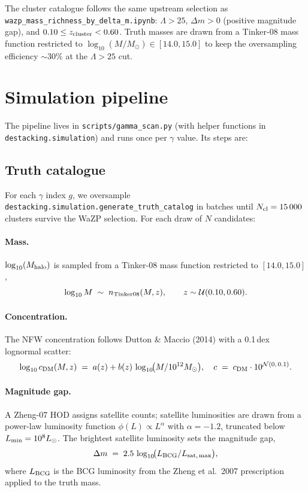 \documentclass[11pt,a4paper]{article}
\newcommand{\Msun}{M_{\odot}}
\newcommand{\Lsun}{L_{\odot}}
\begin{document}
The cluster catalogue follows the same upstream selection as
\verb|wazp_mass_richness_by_delta_m.ipynb|: $\Lambda > 25$, $\Delta m > 0$
(positive magnitude gap), and $0.10 \le z_{\rm cluster} < 0.60$. Truth
masses are drawn from a Tinker-08 mass function restricted to
$\log_{10}(M/\Msun) \in [14.0, 15.0]$ to keep the oversampling
efficiency $\sim$30\% at the $\Lambda > 25$ cut.


\section{Simulation pipeline}
\label{sec:sim}

The pipeline lives in \verb|scripts/gamma_scan.py| (with helper
functions in \verb|destacking.simulation|) and runs once per
$\gamma$ value. Its steps are:

\subsection{Truth catalogue}

For each $\gamma$ index $g$, we oversample
\verb|destacking.simulation.generate_truth_catalog| in batches until
$N_{\rm cl} = 15\,000$ clusters survive the WaZP selection. For each
draw of $N$ candidates:

\paragraph{Mass.}
$\log_{10}(M_{\rm halo})$ is sampled from a Tinker-08
mass function restricted to $[14.0, 15.0]$,
\begin{equation}
\log_{10} M \;\sim\; n_{\rm Tinker08}(M, z),
\qquad z \sim \mathcal{U}(0.10, 0.60).
\end{equation}

\paragraph{Concentration.}
The NFW concentration follows Dutton \& Maccio (2014) with a 0.1\,dex
lognormal scatter:
\begin{equation}
\log_{10} c_{\rm DM}(M, z)
\;=\; a(z) + b(z)\,\log_{10}\!\bigl(M / 10^{12}\Msun\bigr),
\quad
c \;=\; c_{\rm DM} \cdot 10^{\mathcal{N}(0,\,0.1)}.
\end{equation}

\paragraph{Magnitude gap.}
A Zheng-07 HOD assigns satellite counts; satellite luminosities are
drawn from a power-law luminosity function $\phi(L) \propto L^{\alpha}$
with $\alpha = -1.2$, truncated below $L_{\rm min} = 10^{8}\Lsun$.
The brightest satellite luminosity sets the magnitude gap,
\begin{equation}
\Delta m \;=\; 2.5\,\log_{10}\!\bigl(L_{\rm BCG} / L_{\rm sat,\,max}\bigr),
\end{equation}
where $L_{\rm BCG}$ is the BCG luminosity from the Zheng et al.\ 2007
prescription applied to the truth mass.
\end{document}
